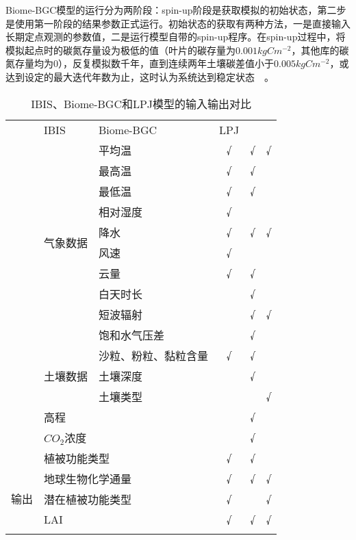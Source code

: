 Biome-BGC模型的运行分为两阶段：spin-up阶段是获取模拟的初始状态，第二步是使用第一阶段的结果参数正式运行。初始状态的获取有两种方法，一是直接输入长期定点观测的参数值，二是运行模型自带的spin-up程序。在spin-up过程中，将模拟起点时的碳氮存量设为极低的值（叶片的碳存量为$0.001kgC m^{-2}$，其他库的碳氮存量均为0），反复模拟数千年，直到连续两年土壤碳差值小于$0.005kgC m^{-2}$，或达到设定的最大迭代年数为止，这时认为系统达到稳定状态~\cite{thornton2005ecosystem}~\cite{pietsch2005bgc}。

\begin{table}[H]
    \centering
    \caption{IBIS、Biome-BGC和LPJ模型的输入输出对比}
    \label{tab:model-io-cmp}
    \begin{threeparttable}
        \begin{tabular}{l|l|l|ccc}
            \Xhline{1.5pt}
            \multicolumn{3}{c|}{数据} & IBIS & Biome-BGC & LPJ \\
            \Xhline{1.5pt}
            \multirow{15}{*}{输入} & \multirow{10}{*}{气象数据} & 平均温 & √ & √ & √ \\
            & & 最高温 & √ & √ & \\
            & & 最低温 & √ & √ & \\
            & & 相对湿度 & √ & & \\
            & & 降水 & √ & √ & √ \\
            & & 风速 & √ & & \\
            & & 云量 & √ & √ & \\
            & & 白天时长 & & √ & \\
            & & 短波辐射 & & √ & √ \\
            & & 饱和水气压差 & & √ & \\
            \cline{2-6}
            & \multirow{3}{*}{土壤数据} & 沙粒、粉粒、黏粒含量 & √ & √ & \\
            & & 土壤深度 & & √ &  \\
            & & 土壤类型 & & & √ \\
            \cline{2-6}
            & \multicolumn{2}{l|}{高程} & & √ & \\
            \cline{2-6}
            & \multicolumn{2}{l|}{$CO_2$浓度} & & √ & \\
            \cline{2-6}
            & \multicolumn{2}{l|}{植被功能类型} & √ & √ & \\
            \hline
            \multirow{3}{*}{输出} & \multicolumn{2}{l|}{地球生物化学通量} & √ & √ & √ \\
            & \multicolumn{2}{l|}{潜在植被功能类型} & √ & & √ \\
            & \multicolumn{2}{l|}{LAI} & √ & √ & √ \\
            \Xhline{1.5pt}
        \end{tabular}
    \end{threeparttable}
\end{table}


